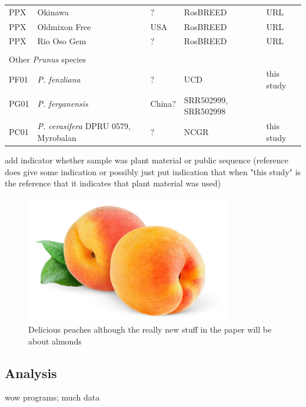 \documentclass[12pt]{article}
\begin{document}
\begin{center}
\begin{longtable}{lllll}
                 PP{\color{red}X} &Okinawa &? &RosBREED &URL \\
                 PP{\color{red}X} &Oldmixon Free &USA &RosBREED &URL \\
                 PP{\color{red}X} &Rio Oso Gem &? &RosBREED &URL \\
                 \multicolumn{5}{l}{} \\
                 \multicolumn{5}{l}{Other {\em{Prunus}} species}  \\
                 PF01 &{\em{P. fenzliana}} &? &UCD &this study\\
                 PG01 &{\em{P. ferganensis}} &China? &\multirow{2}{1cm}{SRR502999, SRR502998} &\citealt{verde2013high}\\
                 \\
                 PC01 &{\em{P. cerasifera}} DPRU 0579, Myrobalan &? &NCGR &this study\\ \hline

\end{longtable}
\end{center}

add indicator whether sample was plant material or public sequence (reference does give some indication or possibly just put indication that when "this study" is the reference that it indicates that plant material was used)

\begin{figure}[b]
\centering
   \includegraphics[width=0.8\textwidth]{peachzdfgad.jpg}
  \caption{Delicious peaches although the really new stuff in the paper will be about almonds}
  \label{fig:peach}
\end{figure}



\subsection*{Analysis}
wow programs; much data


\end{document}
